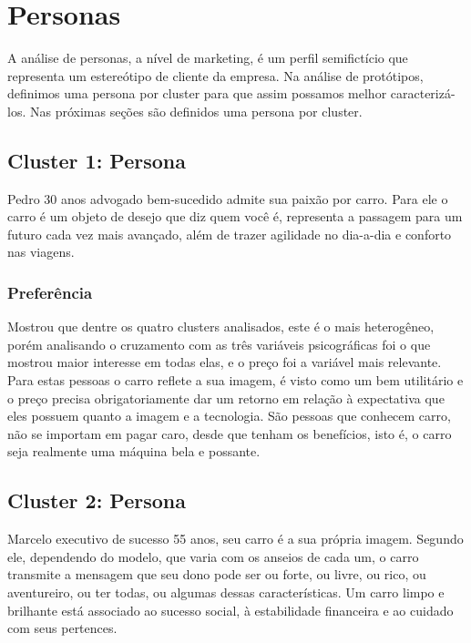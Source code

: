 \section{Personas}

A análise de personas, a nível de marketing, é um perfil semifictício
que representa um estereótipo de cliente da empresa. Na análise de
protótipos, definimos uma persona por cluster para que assim possamos
melhor caracterizá-los. Nas próximas seções são definidos uma persona
por cluster.


\subsection{Cluster 1: Persona \nomeCa{}}

Pedro 30 anos advogado bem-sucedido admite sua paixão por carro. Para
ele o carro é um objeto de desejo que diz quem você é, representa
a passagem para um futuro cada vez mais avançado, além de trazer agilidade
no dia-a-dia e conforto nas viagens. 

\subsubsection{Preferência}
Mostrou que dentre os quatro clusters analisados, este é o mais heterogêneo,
porém analisando o cruzamento com as três variáveis psicográficas
foi o que mostrou maior interesse em todas elas, e o preço foi a variável
mais relevante. Para estas pessoas o carro reflete a sua imagem, é
visto como um bem utilitário e o preço precisa obrigatoriamente dar
um retorno em relação à expectativa que eles possuem quanto a imagem
e a tecnologia. São pessoas que conhecem carro, não se importam em
pagar caro, desde que tenham os benefícios, isto é, o carro seja realmente
uma máquina bela e possante. 


\subsection{Cluster 2: Persona \nomeCb{}}

Marcelo executivo de sucesso 55 anos, seu carro é a sua própria imagem.
Segundo ele, dependendo do modelo, que varia com os anseios de cada
um, o carro transmite a mensagem que seu dono pode ser ou forte, ou
livre, ou rico, ou aventureiro, ou ter todas, ou algumas dessas características.
Um carro limpo e brilhante está associado ao sucesso social, à estabilidade
financeira e ao cuidado com seus pertences. 

